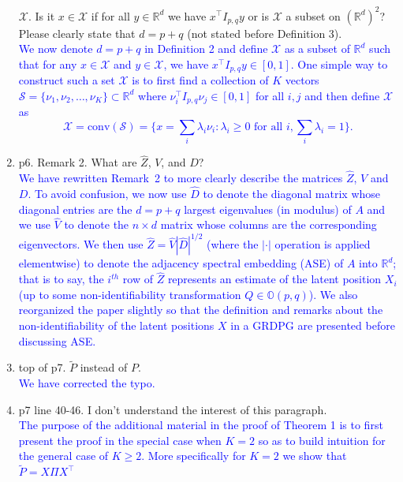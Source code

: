\documentclass[
]{article}
\begin{document}
\begin{enumerate}
  \(\mathcal{X}\). Is it \(x \in \mathcal{X}\) if for all
  \(y \in \mathbb{R}^d\) we have \(x^\top I_{p,q} y\) or is
  \(\mathcal{X}\) a subset on \((\mathbb{R}^d)^2\)? Please clearly state
  that \(d = p + q\) (not stated before Definition 3).\\
  \textcolor{blue}{
  We now denote $d = p + q$ in Definition 2 and define $\mathcal{X}$ as a subset of $\mathbb{R}^{d}$ such
  that for any $x \in \mathcal{X}$ and $y \in \mathcal{X}$, we have
  $x^{\top} I_{p,q} y \in [0,1]$. One simple way to construct such a set
  $\mathcal{X}$ is to first find a collection of $K$ vectors
  $\mathcal{S} = \{\nu_1, \nu_2, \dots, \nu_K\} \subset \mathbb{R}^{d}$
  where $\nu_i^{\top} I_{p,q} \nu_j \in [0,1]$ for all $i,j$ and then define $\mathcal{X}$
  as 
  $$\mathcal{X} = \mathrm{conv}(\mathcal{S}) = \{x = \sum_{i} \lambda_i \nu_i \colon \lambda_i \geq 0 \,\, \text{for all $i$}, \sum_{i} \lambda_i =
  1\}.$$
  }
\item
  p6. Remark 2. What are \(\hat{Z}\), \(V\), and \(D\)?\\
  \textcolor{blue}{
  We have rewritten Remark~2 to more clearly describe the matrices
  $\hat{Z}$, $V$ and $D$. To avoid confusion, we now use $\hat{D}$ to
  denote the diagonal matrix whose diagonal entries are the $d = p + q$
  largest eigenvalues (in modulus) of $A$ and we use $\hat{V}$ to denote
  the $n \times d$ matrix whose columns are the corresponding
  eigenvectors. We then use $\hat{Z} = \hat{V} |\hat{D}|^{1/2}$ (where
  the $|\cdot|$ operation is applied elementwise) to denote the
  adjacency spectral embedding (ASE) of $A$ into $\mathbb{R}^{d}$; that is
  to say, the $i^{th}$ row of $\hat{Z}$ represents an estimate of the
  latent position $X_i$ (up to some non-identifiability transformation
  $Q \in \mathbb{O}(p,q)$). We also reorganized the paper slightly so
  that the definition and remarks about the non-identifiability of the
  latent positions $X$ in a GRDPG are presented before discussing ASE. }
\item
  top of p7. \(\tilde{P}\) instead of \({P}\).\\
  \textcolor{blue}{
  We have corrected the typo. 
  }
\item
  p7 line 40-46. I don't understand the interest of this paragraph.\\
  \textcolor{blue}{
  The purpose of the additional material in the proof of Theorem 1 is to
  first present the proof in the special case when $K = 2$ so as to
  build intuition for the general case of $K \geq 2$. 
  More specifically for $K = 2$ we show that $\tilde{P} = X \Pi X^\top$
}
\end{enumerate}
\end{document}

